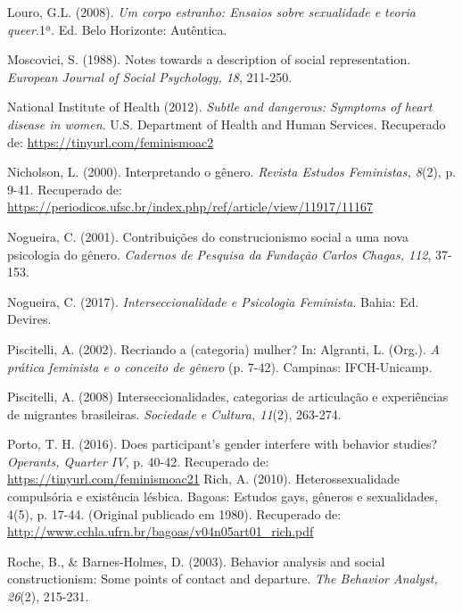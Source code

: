\hangindent=25pt
\noindent Louro, G.L. (2008). \textit{Um corpo estranho: Ensaios sobre sexualidade e teoria queer}.1ª. Ed. Belo Horizonte: Autêntica.

\hangindent=25pt
\noindent Moscovici, S. (1988). Notes towards a description of social representation. \textit{European Journal of Social Psychology, 18}, 211-250. 

\hangindent=25pt
\noindent National Institute of Health (2012). \textit{Subtle and dangerous: Symptoms of heart disease in women}. U.S. Department of Health and Human Services. Recuperado de: \url{https://tinyurl.com/feminismoac2}

\hangindent=25pt
\noindent Nicholson, L. (2000). Interpretando o gênero. \textit{Revista Estudos Feministas, 8}(2), p. 9-41. Recuperado de: \url{https://periodicos.ufsc.br/index.php/ref/article/view/11917/11167}

\hangindent=25pt
\noindent Nogueira, C. (2001). Contribuições do construcionismo social a uma nova psicologia do gênero. \textit{Cadernos de Pesquisa da Fundação Carlos Chagas, 112}, 37-153.

\hangindent=25pt
\noindent Nogueira, C. (2017). \textit{Interseccionalidade e Psicologia Feminista}. Bahia: Ed. Devires. 

\hangindent=25pt
\noindent Piscitelli, A. (2002). Recriando a (categoria) mulher? In: Algranti, L. (Org.). \textit{A prática feminista e o conceito de gênero} (p. 7-42). Campinas: IFCH-Unicamp.

\hangindent=25pt
\noindent Piscitelli, A. (2008) Interseccionalidades, categorias de articulação e experiências de migrantes brasileiras. \textit{Sociedade e Cultura, 11}(2), 263-274.

\hangindent=25pt
\noindent Porto, T. H. (2016). Does participant’s gender interfere with behavior studies? \textit{Operants, Quarter IV}, p. 40-42. Recuperado de: \url{https://tinyurl.com/feminismoac21}
Rich, A. (2010). Heterossexualidade compulsória e existência lésbica. Bagoas: Estudos gays, gêneros e sexualidades, 4(5), p. 17-44. (Original publicado em 1980). Recuperado de: \url{http://www.cchla.ufrn.br/bagoas/v04n05art01_rich.pdf}

\hangindent=25pt
\noindent Roche, B., \& Barnes-Holmes, D. (2003). Behavior analysis and social constructionism: Some points of contact and departure. \textit{The Behavior Analyst, 26}(2), 215-231. 

